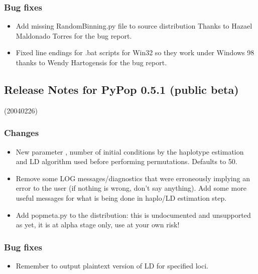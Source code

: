 \documentclass[letterpaper,10pt,english,openany,oneside]{sphinxmanual}
\begin{document}
\subsubsection{Bug fixes}
\label{\detokenize{docs/guide-chapter-changes:id4}}\begin{itemize}
\item {} 
\sphinxAtStartPar
Add missing RandomBinning.py file to source distribution
Thanks to Hazael Maldonado Torres for the bug report.

\item {} 
\sphinxAtStartPar
Fixed line endings for .bat scripts for Win32 so they work under
Windows 98 thanks to Wendy Hartogensis for the bug report.

\end{itemize}


\subsection{Release Notes for PyPop 0.5.1 (public beta)}
\label{\detokenize{docs/guide-chapter-changes:release-notes-for-pypop-0-5-1-public-beta}}
\sphinxAtStartPar
(2004\sphinxhyphen{}02\sphinxhyphen{}26)


\subsubsection{Changes}
\label{\detokenize{docs/guide-chapter-changes:changes}}\begin{itemize}
\item {} 
\sphinxAtStartPar
New parameter , number of initial conditions by the
haplotype estimation and LD algorithm used before performing
permutations. Defaults to 50.

\item {} 
\sphinxAtStartPar
Remove some LOG messages/diagnostics that were erroneously implying
an error to the user (if nothing is wrong, don’t say anything).  Add
some more useful messages for what is being done in haplo/LD
estimation step.

\item {} 
\sphinxAtStartPar
Add popmeta.py to the distribution: this is undocumented and unsupported
as yet, it is at alpha stage only, use at your own risk!

\end{itemize}


\subsubsection{Bug fixes}
\label{\detokenize{docs/guide-chapter-changes:id5}}\begin{itemize}
\item {} 
\sphinxAtStartPar
Remember to output plaintext version of LD for specified loci.

\end{itemize}
\end{document}

